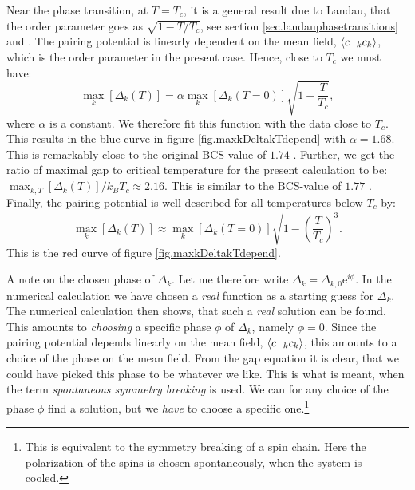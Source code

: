 Near the phase transition, at $T = T_c$, it is a general result due to Landau, that the order parameter goes as $\sqrt{1 - T/T_c}$, see section \ref{sec.landauphasetransitions} and \cite[86-87]{PlischkeStatPhys}. The pairing potential is linearly dependent on the mean field, $\braket{c_{-k}c_k}$, which is the order parameter in the present case. Hence, close to $T_c$ we must have:
\begin{equation}
\max_k[\Delta_k(T)] = \alpha\max_k[\Delta_k(T=0)]\sqrt{1 - \frac{T}{T_c}},  
\label{eq.maxpairingasymp}
\end{equation}
where $\alpha$ is a constant. We therefore fit this function with the data close to $T_c$. This results in the blue curve in figure \ref{fig.maxkDeltakTdepend} with $\alpha = 1.68$. This is remarkably close to the original BCS value of $1.74$ \cite[p. 369]{PlischkeStatPhys}. Further, we get the ratio of maximal gap to critical temperature for the present calculation to be: $\max_{k,T}[\Delta_k(T)]/k_B T_c \approx 2.16$. This is similar to the BCS-value of $1.77$ \cite[p. 369]{PlischkeStatPhys}. Finally, the pairing potential is well described for all temperatures below $T_c$ by:
\begin{equation}
\max_k[\Delta_k(T)] \approx \max_k[\Delta_k(T=0)]\sqrt{1 - \left(\frac{T}{T_c}\right)^3}.
\label{eq.maxpairingapprox}
\end{equation} 
This is the red curve of figure \ref{fig.maxkDeltakTdepend}. 

A note on the chosen phase of $\Delta_k$. Let me therefore write $\Delta_k = \Delta_{k,0}\text{e}^{i\phi}$. In the numerical calculation we have chosen a \textit{real} function as a starting guess for $\Delta_k$. The numerical calculation then shows, that such a \textit{real} solution can be found. This amounts to \textit{choosing} a specific phase $\phi$ of $\Delta_k$, namely $\phi = 0$. Since the pairing potential depends linearly on the mean field, $\braket{c_{-k}c_k}$, this amounts to a choice of the phase on the mean field. From the gap equation it is clear, that we could have picked this phase to be whatever we like. This is what is meant, when the term \textit{spontaneous symmetry breaking} is used. We can for any choice of the phase $\phi$ find a solution, but we \textit{have} to choose a specific one.\footnote{This is equivalent to the symmetry breaking of a spin chain. Here the polarization of the spins is chosen spontaneously, when the system is cooled.} 

